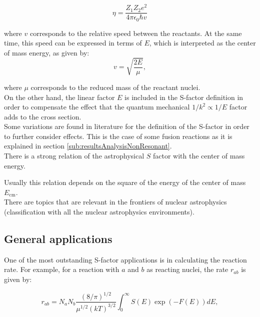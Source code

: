 \documentclass[openany]{book}
\begin{document}
\begin{equation} \label{eq:sfactor_sommerfeld}
	\eta = \frac{Z_1Z_2e^2}{4\pi\epsilon_0\hbar v}
\end{equation}

where $v$ corresponds to the relative speed between the reactants. At the same time, this speed can be expressed in terms of $E$, which is interpreted as the center of mass energy, as given by: \\

\begin{equation}\label{eq:sfactor_speed}
	v = \sqrt{\frac{2E}{\mu}},
\end{equation} 

where $\mu$ corresponds to the reduced mass of the reactant nuclei. \\

On the other hand, the linear factor $E$ is included in the S-factor definition in order to compensate the effect that the quantum mechanical $1/k^2 \propto 1/E$ factor adds to the cross section. \\

Some variations are found in literature for the definition of the S-factor in order to further consider effects. This is the case of some fusion reactions as it is explained in section \ref{sub:resultsAnalysisNonResonant}. \\

There is a strong relation of the astrophysical $S$ factor with the center of mass energy. 

Usually this relation depends on the square of the energy of the center of mass $E_{\mathrm{cm}}$. \\

There are topics that are relevant in the frontiers of nuclear astrophysics  \cite{bertulani_kajino_2016} (classification with all the nuclear astrophysics environments). 

\subsection{General applications} \label{sub:sfactorApplications}

One of the most outstanding S-factor applications is in calculating the reaction rate. For example, for a reaction with $a$ and $b$ as reacting nuclei, the rate $r_{ab}$ is given by:

\begin{equation}\label{eq:sfactor_reactionRate}
	r_{ab} = N_aN_b \frac{(8/\pi)^{1/2}}{\mu^{1/2}(kT)^{3/2}} \int_0^{\infty} {S(E) \exp {(-F(E))} dE},
\end{equation} 
\end{document}
